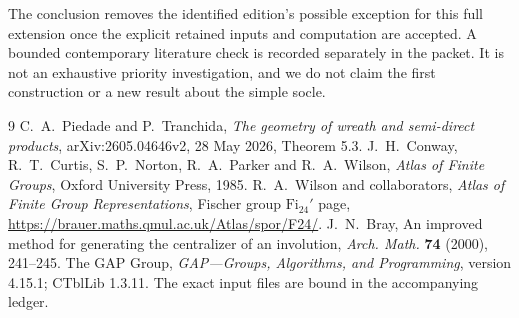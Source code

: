 \documentclass[11pt]{article}
\newcommand{\Fi}{\mathrm{Fi}}
\begin{document}
The conclusion removes the identified edition's possible exception for this full extension once the explicit retained inputs and computation are accepted. A bounded contemporary literature check is recorded separately in the packet. It is not an exhaustive priority investigation, and we do not claim the first construction or a new result about the simple socle.
\begin{thebibliography}{9}
 C.~A.~Piedade and P.~Tranchida, \emph{The geometry of wreath and semi-direct products}, arXiv:2605.04646v2, 28 May 2026, Theorem 5.3.
 J.~H.~Conway, R.~T.~Curtis, S.~P.~Norton, R.~A.~Parker and R.~A.~Wilson, \emph{Atlas of Finite Groups}, Oxford University Press, 1985.
 R.~A.~Wilson and collaborators, \emph{Atlas of Finite Group Representations}, Fischer group $\Fi_{24}'$ page, \url{https://brauer.maths.qmul.ac.uk/Atlas/spor/F24/}.
 J.~N.~Bray, An improved method for generating the centralizer of an involution, \emph{Arch. Math.} \textbf{74} (2000), 241--245.
 The GAP Group, \emph{GAP---Groups, Algorithms, and Programming}, version 4.15.1; CTblLib 1.3.11. The exact input files are bound in the accompanying ledger.
\end{thebibliography}
\end{document}
